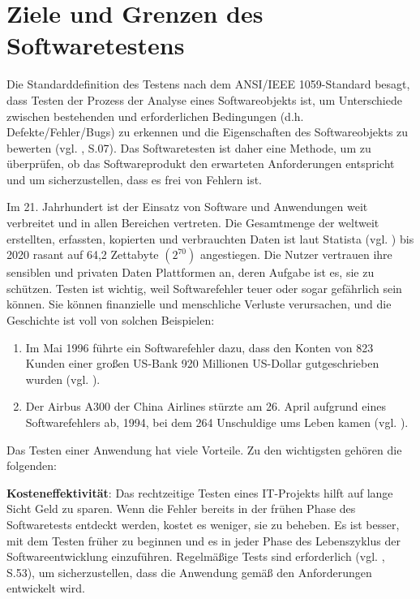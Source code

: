 \section{Ziele und Grenzen des Softwaretestens}

Die Standarddefinition des Testens nach dem
ANSI/IEEE 1059-Standard besagt, dass Testen der
Prozess der Analyse eines Softwareobjekts ist, um
Unterschiede zwischen bestehenden und erforderlichen
Bedingungen (d.h. Defekte/Fehler/Bugs) zu erkennen
und die Eigenschaften des Softwareobjekts zu bewerten (vgl. \cite{singh2012software}, S.07).
Das Softwaretesten ist daher eine Methode, um zu überprüfen,
ob das Softwareprodukt den erwarteten
Anforderungen entspricht und um sicherzustellen, dass
es frei von Fehlern ist.

Im 21. Jahrhundert ist der Einsatz von Software und
Anwendungen weit verbreitet und in allen Bereichen vertreten.
Die Gesamtmenge der weltweit erstellten,
erfassten, kopierten und verbrauchten Daten ist laut
Statista (vgl. \cite{Statista2021}) bis 2020 rasant auf 64,2
Zettabyte \begin{math}(2^{70})\end{math} angestiegen. Die Nutzer vertrauen ihre sensiblen und privaten Daten
Plattformen an, deren Aufgabe ist es, sie zu schützen. Testen
ist wichtig, weil Softwarefehler teuer oder sogar gefährlich
sein können. Sie können finanzielle
und menschliche Verluste verursachen, und die Geschichte
ist voll von solchen Beispielen:

\noindent
\begin{enumerate}
    \item Im Mai 1996 führte ein Softwarefehler dazu, dass
     den Konten von 823 Kunden einer großen US-Bank 920
     Millionen US-Dollar gutgeschrieben wurden (vgl. \cite{Devi2015}).
    \item Der Airbus A300 der China Airlines stürzte am 26. April
    aufgrund eines Softwarefehlers ab, 1994, bei dem 264 Unschuldige
    ums Leben kamen (vgl. \cite{Takeuch1996}).
\end{enumerate}

Das Testen einer Anwendung hat viele Vorteile. Zu den wichtigsten
gehören die folgenden:


 \textbf{Kosteneffektivität}: Das
rechtzeitige Testen eines IT-Projekts hilft auf
lange Sicht Geld zu sparen. Wenn die Fehler bereits in
der frühen Phase des Softwaretests entdeckt werden,
kostet es weniger, sie zu beheben. Es ist besser, mit
dem Testen früher zu beginnen und es in jeder Phase des
Lebenszyklus der Softwareentwicklung einzuführen.
Regelmäßige Tests sind erforderlich (vgl. \cite{kumar2010software}, S.53), um
sicherzustellen, dass die Anwendung gemäß den Anforderungen entwickelt wird.

